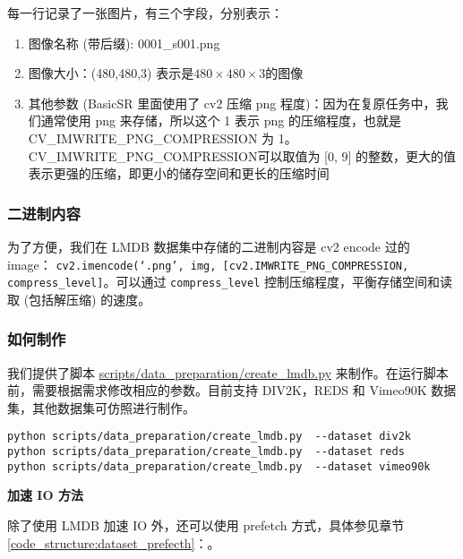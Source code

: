 \documentclass[../main.tex]{subfiles}
\begin{document}
每一行记录了一张图片，有三个字段，分别表示：
\begin{enumerate}
    \item 图像名称 (带后缀): 0001\_s001.png
    \item 图像大小：(480,480,3) 表示是$480\times480\times3$的图像
    \item 其他参数 (BasicSR 里面使用了 cv2 压缩 png 程度)：因为在复原任务中，我们通常使用 png 来存储，所以这个 1 表示 png 的压缩程度，也就是 CV\_IMWRITE\_PNG\_COMPRESSION 为 1。CV\_IMWRITE\_PNG\_COMPRESSION可以取值为 [0, 9] 的整数，更大的值表示更强的压缩，即更小的储存空间和更长的压缩时间
\end{enumerate}

\subsubsection{二进制内容}

为了方便，我们在 LMDB 数据集中存储的二进制内容是 cv2 encode 过的 image：
\texttt{cv2.imencode(`.png', img, [cv2.IMWRITE\_PNG\_COMPRESSION, compress\_level]}。可以通过 \texttt{compress\_level} 控制压缩程度，平衡存储空间和读取 (包括解压缩) 的速度。

\subsubsection{如何制作}

我们提供了脚本 \href{https://github.com/XPixelGroup/BasicSR/blob/master/scripts/data_preparation/create_lmdb.py}{scripts/data\_preparation/create\_lmdb.py} 来制作。在运行脚本前，需要根据需求修改相应的参数。目前支持 DIV2K，REDS 和 Vimeo90K 数据集，其他数据集可仿照进行制作。

\begin{verbatim}
python scripts/data_preparation/create_lmdb.py  --dataset div2k
python scripts/data_preparation/create_lmdb.py  --dataset reds
python scripts/data_preparation/create_lmdb.py  --dataset vimeo90k
\end{verbatim}

\begin{note} %
    \textbf{加速 IO 方法}

    除了使用 LMDB 加速 IO 外，还可以使用 prefetch 方式，具体参见章节\ref{code_structure:dataset_prefecth}：。
\end{note}

\end{document}
